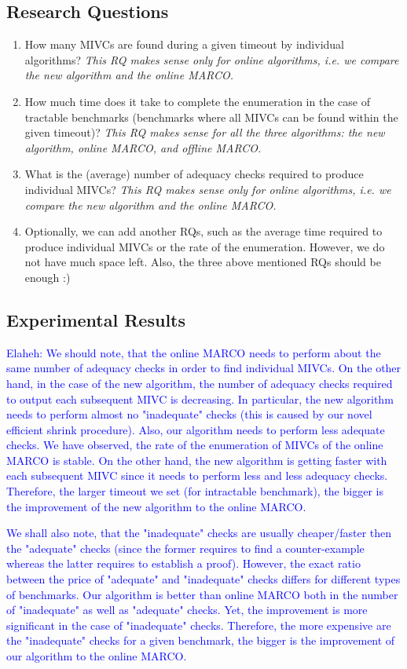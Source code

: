 \subsection{Research Questions}
\begin{enumerate}
	\item How many MIVCs are found during a given timeout by individual algorithms? \emph{This RQ makes sense only for online algorithms, i.e. we compare the new algorithm and the online MARCO.}
	\item How much time does it take to complete the enumeration in the case of tractable benchmarks (benchmarks where all MIVCs can be found within the given timeout)? \emph{This RQ makes sense for all the three algorithms: the new algorithm, online MARCO, and offline MARCO.}
	\item What is the (average) number of adequacy checks required to produce individual MIVCs? \emph{This RQ makes sense only for online algorithms, i.e. we compare the new algorithm and the online MARCO.}
	\item Optionally, we can add another RQs, such as the average time required to produce individual MIVCs or the rate of the enumeration. However, we do not have much space left. Also, the three above mentioned RQs should be enough :)
\end{enumerate}


\subsection{Experimental Results}
\textcolor{blue}{Elaheh: We should note, that the online MARCO needs to perform about the same number of adequacy checks in order to find individual MIVCs. On the other hand, in the case of the new algorithm, the number of adequacy checks required to output each subsequent MIVC is decreasing. In particular, the new algorithm needs to perform almost no "inadequate" checks (this is caused by our novel efficient shrink procedure). Also, our algorithm needs to perform less adequate checks. We have observed, the rate of the enumeration of MIVCs of the online MARCO is stable. On the other hand, the new algorithm is getting faster with each subsequent MIVC since it needs to perform less and less adequacy checks. Therefore, the larger timeout we set (for intractable benchmark), the bigger is the improvement of the new algorithm to the online MARCO.} 

\textcolor{blue}{We shall also note, that the "inadequate" checks are usually cheaper/faster then the "adequate" checks (since the former requires to find a counter-example whereas the latter requires to establish a proof). However, the exact ratio between the price of "adequate" and "inadequate" checks differs for different types of benchmarks. Our algorithm is better than online MARCO both in the number of "inadequate" as well as "adequate" checks. Yet, the improvement is more significant in the case of "inadequate" checks. Therefore, the more expensive are the "inadequate" checks for a given benchmark, the bigger is the improvement of our algorithm to the online MARCO.   }


